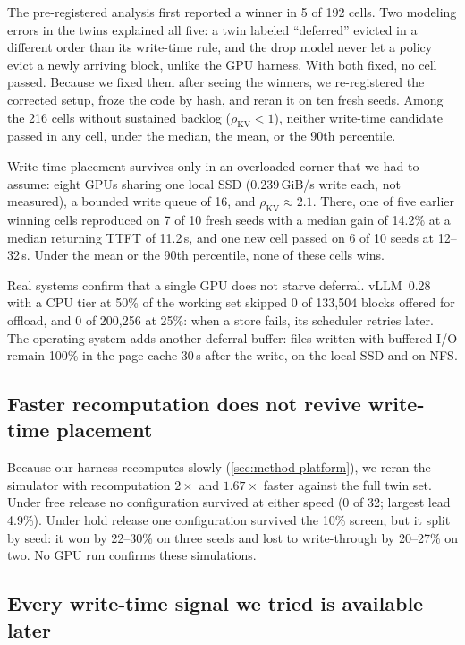 \documentclass[conference]{IEEEtran}
\begin{document}
The pre-registered analysis first reported a winner in 5 of 192 cells.
Two modeling errors in the twins explained all five: a twin labeled ``deferred'' evicted in a different order than its write-time rule, and the drop model never let a policy evict a newly arriving block, unlike the GPU harness.
With both fixed, no cell passed.
Because we fixed them after seeing the winners, we re-registered the corrected setup, froze the code by hash, and reran it on ten fresh seeds.
Among the 216 cells without sustained backlog ($\rho_\mathrm{KV}<1$), neither write-time candidate passed in any cell, under the median, the mean, or the 90th percentile.

Write-time placement survives only in an overloaded corner that we had to assume: eight GPUs sharing one local SSD (0.239\,GiB/s write each, not measured), a bounded write queue of 16, and $\rho_\mathrm{KV}\approx2.1$.
There, one of five earlier winning cells reproduced on 7 of 10 fresh seeds with a median gain of 14.2\% at a median returning TTFT of 11.2\,s, and one new cell passed on 6 of 10 seeds at 12--32\,s.
Under the mean or the 90th percentile, none of these cells wins.

Real systems confirm that a single GPU does not starve deferral.
vLLM~0.28 with a CPU tier at 50\% of the working set skipped 0 of 133,504 blocks offered for offload, and 0 of 200,256 at 25\%: when a store fails, its scheduler retries later.
The operating system adds another deferral buffer: files written with buffered I/O remain 100\% in the page cache 30\,s after the write, on the local SSD and on NFS.

\subsection{Faster recomputation does not revive write-time placement}\label{sec:placement-fast}
Because our harness recomputes slowly (\cref{sec:method-platform}), we reran the simulator with recomputation $2\times$ and $1.67\times$ faster against the full twin set.
Under free release no configuration survived at either speed (0 of 32; largest lead 4.9\%).
Under hold release one configuration survived the 10\% screen, but it split by seed: it won by 22--30\% on three seeds and lost to write-through by 20--27\% on two.
No GPU run confirms these simulations.

\subsection{Every write-time signal we tried is available later}
\end{document}
